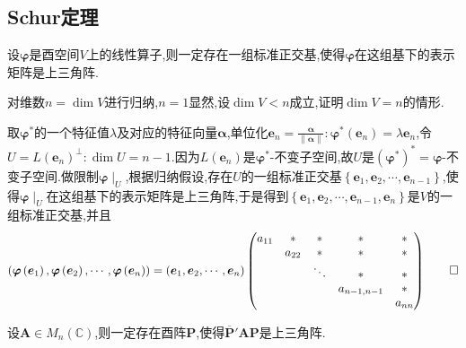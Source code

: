 \subsection{Schur定理}
\begin{green}
    \begin{lemma}[Schur定理]\label{lem:Schur定理}
        设$\bm{\varphi}$是酉空间$V$上的线性算子,则一定存在一组标准正交基,使得$\bm{\varphi}$在这组基下的表示矩阵是上三角阵.
    \end{lemma}
    \begin{Proof}
        对维数$n=\dim V$进行归纳,$n=1$显然,设$\dim V<n$成立,证明$\dim V=n$的情形.

        取$\bm{\varphi}^*$的一个特征值$\lambda$及对应的特征向量$\bm{\alpha}$,单位化$\displaystyle\bm{e}_n=\frac{\bm{\alpha}}{\left\lVert\bm{\alpha}\right\rVert}:\bm{\varphi}^*\left(\bm{e}_n\right)=\lambda\bm{e}_n$,令$U=L\left(\bm{e}_n\right)^{\perp}:\dim U=n-1.$因为$L\left(\bm{e}_n\right)$是$\bm{\varphi}^*$-不变子空间,故$U$是$\left(
            \bm{\varphi}^*
        \right)^*=\bm{\varphi}$-不变子空间.做限制$\bm{\varphi}\mid_U$,根据归纳假设,存在$U$的一组标准正交基$\left\{
            \bm{e}_1,\bm{e}_2,\cdots,\bm{e}_{n-1}
            \right\}$,使得$\bm{\varphi}\mid_U$在这组基下的表示矩阵是上三角阵,于是得到$\left\{
            \bm{e}_1,\bm{e}_2,\cdots,\bm{e}_{n-1},\bm{e}_n
            \right\}$是$V$的一组标准正交基,并且\[
            \left(
                \bm{\varphi}\left(
                    \bm{e}_1
                \right),\bm{\varphi}\left(
                    \bm{e}_2
                \right),\cdots,\bm{\varphi}\left(
                    \bm{e}_n
                \right)
            \right)=\left(
                \bm{e}_1,\bm{e}_2,\cdots,\bm{e}_n
            \right)\begin{pmatrix}
                a_{11}&*&*&*&*\\
                &a_{22}&*&*&*\\
                &&\ddots&*&*\\
                &&&a_{n-1,n-1}&*\\
                &&&&a_{nn}
            \end{pmatrix}\qedhere
            \]
    \end{Proof}
\end{green}
\begin{green}
    \begin{corollary}[Schur定理]\label{cor:Schur定理}
        设$\bm{A}\in M_n\left(\mathbb{C}\right)$,则一定存在酉阵$\bm{P}$,使得$\overline{\bm{P}}'\bm{A}\bm{P}$是上三角阵.
    \end{corollary}
\end{green}
